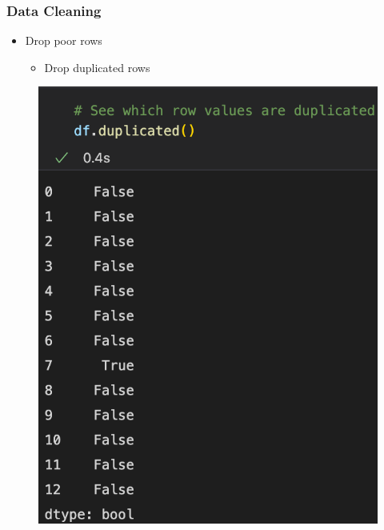 \begin{frame}\frametitle{Data Cleaning}
   \begin{itemize}
      \item Drop poor rows
      \begin{itemize}
         \item Drop duplicated rows
      \end{itemize}
   \end{itemize}
   \vspace{.5cm}
   \begin{minipage}{0.38\linewidth}
      \begin{figure}[H]
         \includegraphics[scale=.35]{../images/illustrations/data_cleaning_detect_rows_duplicated.png}
      \end{figure}
   \end{minipage}
   \begin{minipage}{0.58\linewidth}
      \begin{figure}[H]

\end{figure}
\end{minipage}
\end{frame}
